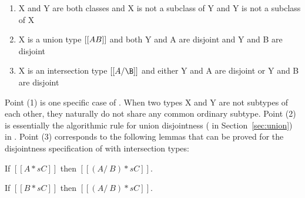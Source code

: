 \begin{enumerate}
  \item{X and Y are both classes and X is not a subclass of Y and Y is not a subclass of X}
  \item{X is a union type $[[A \/ B]]$ and both Y and A are disjoint and Y and B are disjoint}
  \item{X is an intersection type $[[A/\B]]$ and either Y and A are disjoint or Y and B are disjoint}
\end{enumerate}

\noindent
Point (1) is one specific case of .
When two types X and Y are not subtypes of each other, they naturally do not share any common ordinary subtype.
Point (2) is essentially the algorithmic
rule for union disjointness ( in Section~\ref{sec:union}) in \cal.
Point (3) corresponds to the following lemmas that can be proved
for the disjointness specification of \name with intersection types:

\begin{comment}
When a component type (either $[[A]]$ or $[[B]]$) of an intersection type $[[A /\ B]]$
is disjoint to some type $[[C]]$. Then that specific
component type (either $[[A]]$ or $[[B]]$) and type $[[C]]$ 
do not share any common ordinary subtype.
If a component type of intersection type do not share ordinary subtype
with some type, then naturally complete intersection type do not share
ordinary subtype with that type. 
Therefore, $[[C]]$ is disjoint to $[[A /\ B]]$ if it is disjoint to either of
the component type in intersection type.
For example, type $[[Int /\ Top]]$ is disjoint to type $[[Bool]]$.
Because first component of $[[Int /\ Top]]$, which is $[[Int]]$ in this case,
is disjoint to $[[Bool]]$.
Following \Cref{def:inter:disj}, $[[Int]]$ and $[[Bool]]$ do not share any
ordinary subtype and so $[[Int /\ Top]]$ and $[[Bool]]$.
We show this property with following two lemmas in \name:
\end{comment}

\begin{lemma}
  If $[[A *s C]]$ then $[[(A /\ B) *s C]]$.
\label{lemma:discussion:comp:left:inter}
\end{lemma}
\vspace{-15pt}
\begin{lemma}
  If $[[B *s C]]$ then $[[(A /\ B) *s C]]$.
\label{lemma:discussion:comp:right:inter}
\end{lemma}
